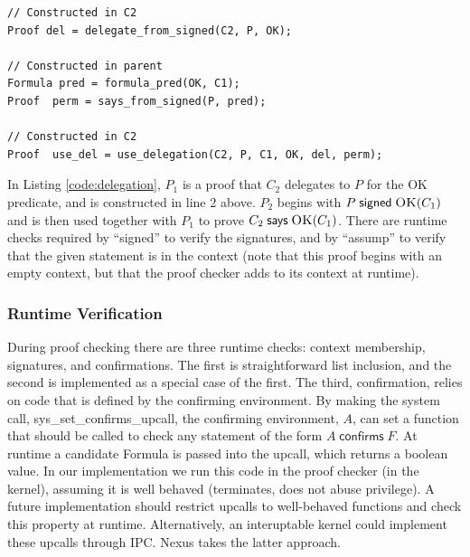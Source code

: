 \documentclass[10pt]{article}
\newcommand{\sign}[2]{\ensuremath{#1\;\textsf{signed}\;#2}}
\newcommand{\says}[2]{\ensuremath{#1\;\textsf{says}\;#2}}
\newcommand{\confirms}[2]{\ensuremath{#1\;\textsf{confirms}\;#2}}
\newcommand{\pred}[2]{\ensuremath{\textsc{#1}(#2)}}
\begin{document}
\begin{lstlisting}
// Constructed in C2
Proof del = delegate_from_signed(C2, P, OK);  

// Constructed in parent
Formula pred = formula_pred(OK, C1);
Proof  perm = says_from_signed(P, pred);

// Constructed in C2
Proof  use_del = use_delegation(C2, P, C1, OK, del, perm);
\end{lstlisting}
In Listing \ref{code:delegation}, $P_1$ is a proof that $C_2$ delegates to $P$ for the OK predicate, and is constructed in line 2 above.  $P_2$ begins with $\sign{P}{\pred{OK}{C_1}}$ and is then used together with $P_1$ to prove $\says{C_2}{\pred{OK}{C_1}}$.  There are runtime checks required by ``signed'' to verify the signatures, and by ``assump'' to verify that the given statement is in the context (note that this proof begins with an empty context, but that the proof checker adds to its context at runtime).  

\subsubsection{Runtime Verification}
During proof checking there are three runtime checks: context membership, signatures,  and confirmations.  The first is straightforward list inclusion, and the second is implemented as a special case of the first.  The third, confirmation, relies on code that is defined by the confirming environment.  By making the system call, \textsf{sys\_set\_confirms\_upcall}, the confirming environment, $A$, can set a function that should be called to check any statement of the form $\confirms{A}{F}$.  At runtime a candidate Formula is passed into the upcall, which returns a boolean value.  In our implementation we run this code in the proof checker (in the kernel), assuming it is well behaved (terminates, does not abuse privilege).  A future implementation should restrict upcalls to well-behaved functions and check this property at runtime. Alternatively, an interuptable kernel could implement these upcalls through IPC. Nexus takes the latter approach.
\end{document}
